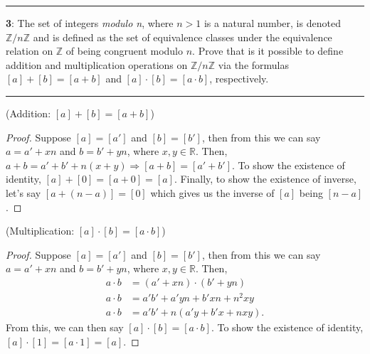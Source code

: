 \documentclass[11pt]{article}
\newcommand\question[2]{\vspace{.25in}\hrule\textbf{#1}: #2\vspace{.5em}\hrule\vspace{.10in}}
\renewcommand\part[1]{\vspace{.10in}(#1)\par}
\newcommand{\R}{\mathbb{R}}
\newcommand{\Z}{\mathbb{Z}}
\begin{document}
\question{3}{The set of integers \textit{modulo n}, where $n > 1$ is a natural number, is denoted $\Z/n\Z$ and is defined as the set of equivalence classes under the equivalence relation on $\Z$ of being congruent modulo $n$. Prove that is it possible to define addition and multiplication operations on $\Z/n\Z$ via the formulas $[a]+[b] = [ a + b]$ and $[a] \cdot [b] = [ a \cdot b]$, respectively.}

\part{Addition: $[a] +[b] = [a+b]$}
\begin{proof}
	Suppose $[a] = [a']$ and $[b]=[b']$, then from this we can say $a = a'+xn$ and $b = b'+yn$, where $x,y \in \R$. Then, $a+b = a' + b' + n(x + y) \Rightarrow [a+b] = [a'+b']$. To show the existence of identity, $[a] + [0] = [a + 0] = [a]$. Finally, to show the existence of inverse, let's say $[a+(n-a)] = [0]$ which gives us the inverse of $[a]$ being $[n-a]$.
\end{proof}

\pagebreak

\part{Multiplication: $[a]\cdot[b] = [a\cdot b]$}
\begin{proof}
	Suppose $[a]=[a']$ and $[b]=[b']$, then from this we can say $a=a'+xn$ and $b=b'+yn$, where $x,y \in \R$. Then,
	\begin{align*}
	 	a \cdot b &= (a'+xn) \cdot (b'+yn)\\
	 	a \cdot b &= a'b' + a'yn + b'xn + n^2xy\\
	 	a \cdot b &= a'b' + n(a'y + b'x + nxy).
	 \end{align*}
	 From this, we can then say $[a] \cdot [b] = [a \cdot b]$. To show the existence of identity, $[a]\cdot[1] = [a \cdot 1] = [a]$.
\end{proof}


	
\end{document}
